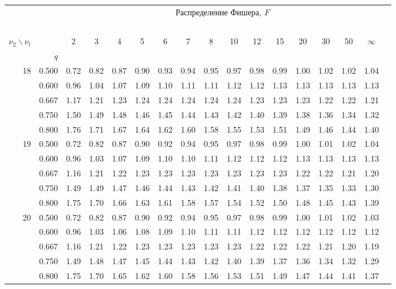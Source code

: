 {\begin{center}
\begin{tabular}{rrr@{\,}r@{\,}r@{\,}r@{\,}r@{\,}r@{\,}r@{\,}r
                   @{\,}r@{\,}r@{\,}r@{\,}r@{\,}r@{\,}r@{\,}r}
&&\multicolumn{14}{c}{Распределение Фишера, $F$}\\
\ \\
$\nu_2\backslash\nu_l$ & & 
\multicolumn{1}{c}{2} &\multicolumn{1}{c}{3} &
\multicolumn{1}{c}{4} &\multicolumn{1}{c}{5} &
\multicolumn{1}{c}{6} &\multicolumn{1}{c}{7} &
\multicolumn{1}{c}{8} &\multicolumn{1}{c}{10}&
\multicolumn{1}{c}{12}&\multicolumn{1}{c}{15}&
\multicolumn{1}{c}{20}&\multicolumn{1}{c}{30}&
\multicolumn{1}{c}{50}&\multicolumn{1}{c}{$\infty$}\\
& $q$ \\
18&0.500&0.72&0.82&0.87&0.90&0.93&0.94&0.95&0.97&0.98&0.99&1.00&1.02&1.02&1.04\\
  &0.600&0.96&1.04&1.07&1.09&1.10&1.11&1.11&1.12&1.12&1.13&1.13&1.13&1.13&1.13\\
  &0.667&1.17&1.21&1.23&1.24&1.24&1.24&1.24&1.24&1.23&1.23&1.23&1.22&1.22&1.21\\
  &0.750&1.50&1.49&1.48&1.46&1.45&1.44&1.43&1.42&1.40&1.39&1.38&1.36&1.34&1.32\\
  &0.800&1.76&1.71&1.67&1.64&1.62&1.60&1.58&1.55&1.53&1.51&1.49&1.46&1.44&1.40\\
19&0.500&0.72&0.82&0.87&0.90&0.92&0.94&0.95&0.97&0.98&0.99&1.00&1.01&1.02&1.04\\
  &0.600&0.96&1.03&1.07&1.09&1.10&1.10&1.11&1.12&1.12&1.12&1.13&1.13&1.13&1.13\\
  &0.667&1.16&1.21&1.22&1.23&1.23&1.23&1.23&1.23&1.23&1.23&1.22&1.22&1.21&1.20\\
  &0.750&1.49&1.49&1.47&1.46&1.44&1.43&1.42&1.41&1.40&1.38&1.37&1.35&1.33&1.30\\
  &0.800&1.75&1.70&1.66&1.63&1.61&1.58&1.57&1.54&1.52&1.50&1.48&1.45&1.43&1.39\\
20&0.500&0.72&0.82&0.87&0.90&0.92&0.94&0.95&0.97&0.98&0.99&1.00&1.01&1.02&1.03\\
  &0.600&0.96&1.03&1.06&1.08&1.09&1.10&1.11&1.11&1.12&1.12&1.12&1.12&1.12&1.12\\
  &0.667&1.16&1.21&1.22&1.23&1.23&1.23&1.23&1.23&1.22&1.22&1.22&1.21&1.20&1.19\\
  &0.750&1.49&1.48&1.47&1.45&1.44&1.43&1.42&1.40&1.39&1.37&1.36&1.34&1.32&1.29\\
  &0.800&1.75&1.70&1.65&1.62&1.60&1.58&1.56&1.53&1.51&1.49&1.47&1.44&1.41&1.37\\

\end{tabular}
\end{center}}
